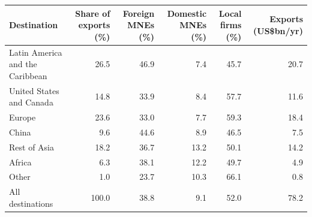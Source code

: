 \begin{tabular}{lrrrrr}
\toprule
Destination & Share of exports (\%) & Foreign MNEs (\%) & Domestic MNEs (\%) & Local firms (\%) & Exports (US\$bn/yr) \\
\midrule
Latin America and the Caribbean & 26.5 & 46.9 & 7.4 & 45.7 & 20.7 \\
United States and Canada & 14.8 & 33.9 & 8.4 & 57.7 & 11.6 \\
Europe & 23.6 & 33.0 & 7.7 & 59.3 & 18.4 \\
China & 9.6 & 44.6 & 8.9 & 46.5 & 7.5 \\
Rest of Asia & 18.2 & 36.7 & 13.2 & 50.1 & 14.2 \\
Africa & 6.3 & 38.1 & 12.2 & 49.7 & 4.9 \\
Other & 1.0 & 23.7 & 10.3 & 66.1 & 0.8 \\
\midrule
All destinations & 100.0 & 38.8 & 9.1 & 52.0 & 78.2 \\
\bottomrule
\end{tabular}
